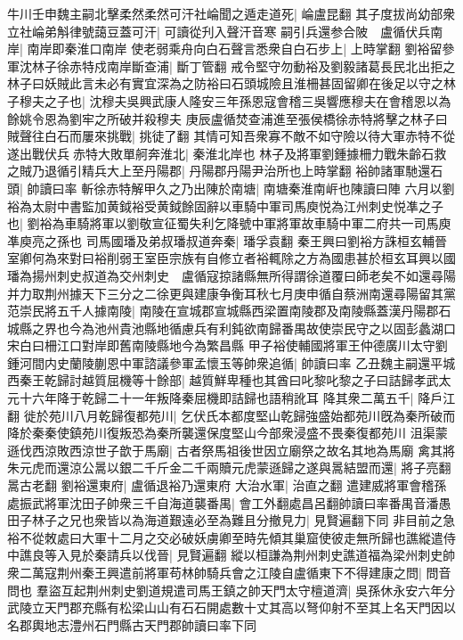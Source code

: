牛川壬申魏主嗣北擊柔然柔然可汗社崘聞之遁走道死|{
	崘盧昆翻}
其子度拔尚幼部衆立社崘弟斛律號藹豆蓋可汗|{
	可讀從刋入聲汗音寒}
嗣引兵還参合陂　盧循伏兵南岸|{
	南岸即秦淮口南岸}
使老弱乘舟向白石聲言悉衆自白石步上|{
	上時掌翻}
劉裕留參軍沈林子徐赤特戍南岸斷查浦|{
	斷丁管翻}
戒令堅守勿動裕及劉毅諸葛長民北出拒之林子曰妖賊此言未必有實宜深為之防裕曰石頭城險且淮柵甚固留卿在後足以守之林子穆夫之子也|{
	沈穆夫吳興武康人隆安三年孫恩寇會稽三吳響應穆夫在會稽恩以為餘姚令恩為劉牢之所破并殺穆夫}
庚辰盧循焚查浦進至張侯橋徐赤特將擊之林子曰賊聲往白石而屢來挑戰|{
	挑徒了翻}
其情可知吾衆寡不敵不如守險以待大軍赤特不從遂出戰伏兵赤特大敗單舸奔淮北|{
	秦淮北岸也}
林子及將軍劉鍾據柵力戰朱齡石救之賊乃退循引精兵大上至丹陽郡|{
	丹陽郡丹陽尹治所也上時掌翻}
裕帥諸軍馳還石頭|{
	帥讀曰率}
斬徐赤特解甲久之乃出陳於南塘|{
	南塘秦淮南㟁也陳讀曰陣}
六月以劉裕為太尉中書監加黄鉞裕受黄鉞餘固辭以車騎中軍司馬庾悦為江州刺史悦凖之子也|{
	劉裕為車騎將軍以劉敬宣征蜀失利乞降號中軍將軍故車騎中軍二府共一司馬庾凖庾亮之孫也}
司馬國璠及弟叔璠叔道奔秦|{
	璠孚袁翻}
秦王興曰劉裕方誅桓玄輔晉室卿何為來對曰裕削弱王室臣宗族有自修立者裕輒除之方為國患甚於桓玄耳興以國璠為揚州刺史叔道為交州刺史　盧循寇掠諸縣無所得謂徐道覆曰師老矣不如還尋陽并力取荆州據天下三分之二徐更與建康争衡耳秋七月庚申循自蔡洲南還尋陽留其黨范崇民將五千人據南陵|{
	南陵在宣城郡宣城縣西梁置南陵郡及南陵縣蓋漢丹陽郡石城縣之界也今為池州貴池縣地循慮兵有利鈍欲南歸番禺故使崇民守之以固彭蠡湖口宋白曰柵江口對岸即舊南陵縣地今為繁昌縣}
甲子裕使輔國將軍王仲德廣川太守劉鍾河間内史蘭陵蒯恩中軍諮議參軍孟懷玉等帥衆追循|{
	帥讀曰率}
乙丑魏主嗣還平城　西秦王乾歸討越質屈機等十餘部|{
	越質鮮卑種也其酋曰叱黎叱黎之子曰詰歸孝武太元十六年降于乾歸二十一年叛降秦屈機即詰歸也語稍訛耳}
降其衆二萬五千|{
	降戶江翻}
徙於苑川八月乾歸復都苑川|{
	乞伏氏本都度堅山乾歸強盛始都苑川旣為秦所破而降於秦秦使鎮苑川復叛恐為秦所襲還保度堅山今部衆浸盛不畏秦復都苑川}
沮渠蒙遜伐西涼敗西涼世子歆于馬廟|{
	古者祭馬祖後世因立廟祭之故名其地為馬廟}
禽其將朱元虎而還涼公暠以銀二千斤金二千兩贖元虎蒙遜歸之遂與暠結盟而還|{
	將子亮翻暠古老翻}
劉裕還東府|{
	盧循退裕乃還東府}
大治水軍|{
	治直之翻}
遣建威將軍會稽孫處振武將軍沈田子帥衆三千自海道襲番禺|{
	會工外翻處昌呂翻帥讀曰率番禺音潘愚}
田子林子之兄也衆皆以為海道艱遠必至為難且分撤見力|{
	見賢遍翻下同}
非目前之急裕不從敇處曰大軍十二月之交必破妖虜卿至時先傾其巢窟使彼走無所歸也譙縱遣侍中譙良等入見於秦請兵以伐晉|{
	見賢遍翻}
縱以桓謙為荆州刺史譙道福為梁州刺史帥衆二萬寇荆州秦王興遣前將軍苟林帥騎兵會之江陵自盧循東下不得建康之問|{
	問音問也}
羣盜互起荆州刺史劉道規遣司馬王鎮之帥天門太守檀道濟|{
	吳孫休永安六年分武陵立天門郡充縣有松梁山山有石石開處數十丈其高以弩仰射不至其上名天門因以名郡輿地志澧州石門縣古天門郡帥讀曰率下同}
